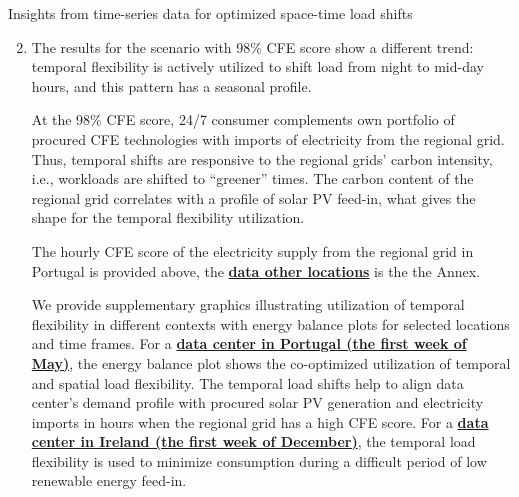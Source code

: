 \begin{frame}{Insights from time-series data for optimized space-time load shifts}

  {\footnotesize 

  \begin{enumerate}
    \setcounter{enumi}{1}
    \item The results for the scenario with 98\% CFE score show a different trend: temporal flexibility is actively utilized to shift load from night to mid-day hours, and this pattern has a seasonal profile. 

    \vspace{0.1cm}
    At the 98\% CFE score, 24/7 consumer complements own portfolio of procured CFE technologies with imports of electricity from the regional grid. Thus, temporal shifts are \alert{responsive to the regional grids' carbon intensity}, i.e., workloads are shifted to \enquote{greener} times. The carbon content of the regional grid correlates with a profile of solar PV feed-in, what gives the shape for the temporal flexibility utilization. 
    
    \vspace{0.1cm}
    The hourly CFE score of the electricity supply from the regional grid in Portugal is provided above, the {\bf \hyperlink{CFEheatmaps}{data other locations}} is the the Annex.

    \vspace{0.1cm}
    We provide supplementary graphics illustrating utilization of temporal flexibility in different contexts with energy balance plots for selected locations and time frames. For a {\bf \hyperlink{nbtemp-40-PT}{data center in Portugal (the first week of May)}}, the energy balance plot shows the co-optimized utilization of temporal and spatial load flexibility. The temporal load shifts help to align data center's demand profile with procured solar PV generation and electricity imports in hours when the regional grid has a high CFE score. For a {\bf \hyperlink{nbtemp-40-PT}{data center in Ireland (the first week of December)}}, the temporal load flexibility is used to minimize consumption during a difficult period of low renewable energy feed-in.

  \end{enumerate}
  }
\end{frame}


